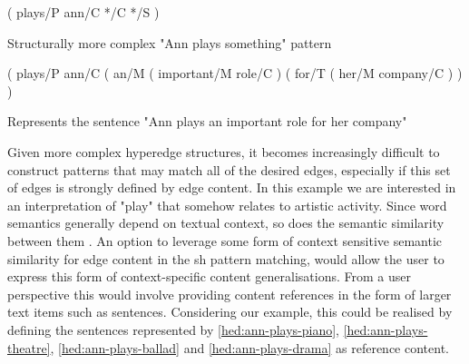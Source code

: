 \documentclass[11pt]{scrreprt}
\let\cite\parencite  %
\begin{document}
\begin{pattern}[h!]
  \normalfont\sffamily
  \centering
  ( plays/P ann/C */C */S )
  \caption{Structurally more complex "Ann plays something" pattern}
  \label{pat:ann-plays-something-complex}
\end{pattern}
  
\begin{hedge}[h!]
  \normalfont\sffamily
  \centering
( plays/P ann/C ( an/M ( important/M role/C ) ( for/T ( her/M company/C ) ) )
  \caption{Represents the sentence "Ann plays an important role for her company"}
  \label{hed:ann-plays-company}
\end{hedge}

Given more complex hyperedge structures, it becomes increasingly difficult to construct patterns that may match all of the desired edges, especially if this set of edges is strongly defined by edge content. In this example we are interested in an interpretation of "play" that somehow relates to artistic activity. Since word semantics generally depend on textual context, so does the semantic similarity between them \cite[Section 2.2.3]{harispeSemanticSimilarityNatural2015}. An option to leverage some form of context sensitive semantic similarity for edge content in the \gls{sh} pattern matching, would allow the user to express this form of context-specific content generalisations. From a user perspective this would involve providing content references in the form of larger text items such as sentences. Considering our example, this could be realised by defining the sentences represented by \cref{hed:ann-plays-piano}, \cref{hed:ann-plays-theatre}, \cref{hed:ann-plays-ballad} and \cref{hed:ann-plays-drama} as reference content.

\end{document}
